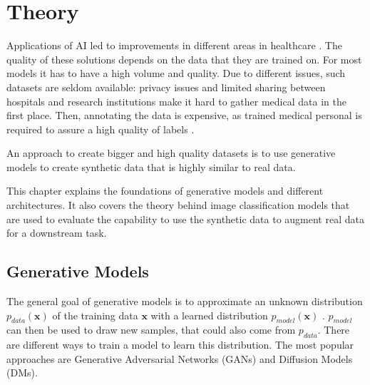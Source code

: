 
\chapter{Theory}
\label{cha:theory}

Applications of AI led to improvements in different areas in healthcare . The quality of these solutions depends on the data 
that they are trained on. For most models it has to have a high volume and quality. Due to different issues, such datasets are seldom available: 
privacy issues and limited sharing between hospitals and research institutions make it hard to gather medical data in the first place. Then, 
annotating the data is expensive, as trained medical personal is required to assure a high quality of labels \cite{ibrahim_generative_2025}.

An approach to create bigger and high quality datasets is to use generative models to create synthetic data that is highly similar to real data.    

This chapter explains the foundations of generative models and different architectures. It also covers the theory behind image classification models
that are used to evaluate the capability to use the synthetic data to augment real data for a downstream task. 

\section{Generative Models}

The general goal of generative models is to approximate an unknown distribution $p_{data}(\boldsymbol{x})$ of the training data $\boldsymbol{x}$ 
with a learned distribution $p_{model}(\boldsymbol{x})$ \cite{goodfellow_generative_2020}. $p_{model}$ can then be used to draw new samples, that 
could also come from $p_{data}$. There are different ways to train a model to learn this distribution. The most popular approaches are Generative 
Adversarial Networks (GANs) and Diffusion Models (DMs).

